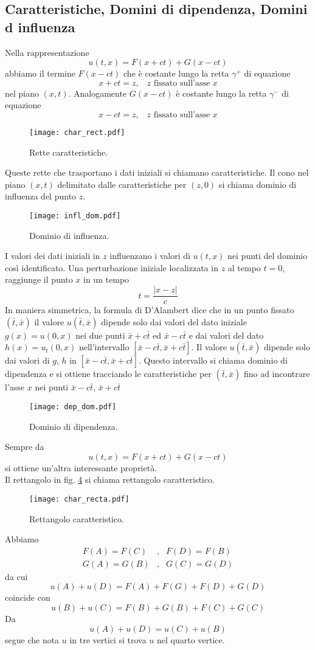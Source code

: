 \subsection{Caratteristiche, Domini di dipendenza, Domini d influenza}
Nella rappresentazione
\[
	u(t,x)=F(x+ct) + G(x-ct)
\]
abbiamo il termine $F(x-ct)$ che \`e costante lungo la retta $\gamma^+$ di
equazione
\[
	x+ct=z, \;\;\; \text{$z$ fissato sull'asse $x$}
\]
nel piano $(x,t)$. Analogamente $G(x-ct)$ \`e costante lungo la retta
$\gamma^-$ di equazione
\[
	x-ct=z, \;\;\; \text{$z$ fissato sull'asse $x$}
\]
\begin{figure}[H]
	\centering
	\texttt{[image: char\_rect.pdf]}
	\caption{Rette caratteristiche.}
	\label{char_rect}
\end{figure}
\noindent
Queste rette che trasportano i dati iniziali si chiamano caratteristiche. Il
cono nel piano $(x,t)$ delimitato dalle caratteristiche per $(z,0)$ si chiama
dominio di influenza del punto $z$.
\begin{figure}[H]
	\centering
	\texttt{[image: infl\_dom.pdf]}
	\caption{Dominio di influenza.}
	\label{infl_dom}
\end{figure}
\noindent
I valori dei dati iniziali in $z$ influenzano i valori di $u(t,x)$ nei punti
del dominio cos\`i identificato. Una perturbazione iniziale localizzata in $z$
al tempo $t=0$, raggiunge il punto $x$ in un tempo
\[
	t=\frac{|x-z|}{c}
\]
In maniera simmetrica, la formula di D'Alambert dice che in un punto fissato
$(\bar{t}, \bar{x})$ il valore $u(\bar{t}, \bar{x})$ dipende solo dai valori
del dato iniziale $g(x)=u(0,x)$ nei due punti $\bar{x}+ c\bar{t}$ ed $\bar{x}-
c\bar{t}$ e dai valori del dato $h(x)=u_t(0,x)$ nell'intervallo $[\bar{x}-
c\bar{t}, \bar{x}+ c\bar{t}]$. Il valore $u(\bar{t}, \bar{x})$ dipende solo dai
valori di $g$, $h$ in $[\bar{x}- c\bar{t}, \bar{x}+ c\bar{t}]$.
Questo intervallo si chiama dominio di dipendenza e si ottiene tracciando le
caratteristiche per $(\bar{t}, \bar{x})$ fino ad incontrare l'asse $x$ nei
punti $\bar{x} - c\bar{t}$, $\bar{x}+ c\bar{t}$
\begin{figure}[H]
	\centering
	\texttt{[image: dep\_dom.pdf]}
	\caption{Dominio di dipendenza.}
	\label{dep_dom}
\end{figure}
\noindent
Sempre da
\[
	u(t,x)= F(x+ct) + G(x-ct)
\]
si ottiene un'altra interessante propriet\`a.\\
Il rettangolo in fig. \ref{char_recta} si chiama rettangolo caratteristico.
\vspace{5mm}
\begin{figure}[H]
	\centering
	\texttt{[image: char\_recta.pdf]}
	\caption{Rettangolo caratteristico.}
	\label{char_recta}
\end{figure}
\noindent
Abbiamo
\[
	\begin{array}{lcl}
		F(A)=F(C) 	&,&	F(D)=F(B)\\
		G(A)=G(B)	&,&	G(C)=G(D)
	\end{array}
\]
da cui
\[
	u(A)+u(D)=F(A)+F(G)+F(D)+G(D)
\]
coincide con
\[
	u(B)+u(C)= F(B)+G(B)+F(C)+G(C)
\]
Da
\[
	u(A)+u(D)=u(C)+u(B)
\]
segue che nota $u$ in tre vertici si trova $u$ nel quarto vertice.

